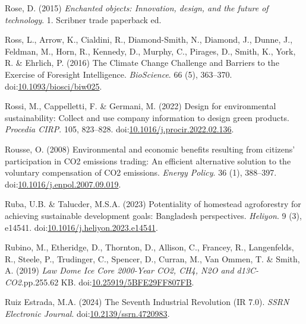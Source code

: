 \documentclass[
  letterpaper,
  DIV=11,
  numbers=noendperiod]{scrartcl}
\newlength{\cslhangindent}
\newenvironment{CSLReferences}[2] %
 {\begin{list}{}{%
  \setlength{\itemindent}{0pt}
  \setlength{\leftmargin}{0pt}
  \setlength{\parsep}{0pt}
  \ifodd #1
   \setlength{\leftmargin}{\cslhangindent}
   \setlength{\itemindent}{-1\cslhangindent}
  \fi
  \setlength{\itemsep}{#2\baselineskip}}}
 {\end{list}}
\begin{document}
\begin{CSLReferences}{0}{1}
Rose, D. (2015) \emph{Enchanted objects: Innovation, design, and the
future of technology}. 1. Scribner trade paperback ed.

Ross, L., Arrow, K., Cialdini, R., Diamond-Smith, N., Diamond, J.,
Dunne, J., Feldman, M., Horn, R., Kennedy, D., Murphy, C., Pirages, D.,
Smith, K., York, R. \& Ehrlich, P. (2016) The {Climate Change Challenge}
and {Barriers} to the {Exercise} of {Foresight Intelligence}.
\emph{BioScience}. 66 (5), 363--370.
doi:\href{https://doi.org/10.1093/biosci/biw025}{10.1093/biosci/biw025}.

Rossi, M., Cappelletti, F. \& Germani, M. (2022) Design for
environmental sustainability: Collect and use company information to
design green products. \emph{Procedia CIRP}. 105, 823--828.
doi:\href{https://doi.org/10.1016/j.procir.2022.02.136}{10.1016/j.procir.2022.02.136}.

Rousse, O. (2008) Environmental and economic benefits resulting from
citizens' participation in {CO2} emissions trading: {An} efficient
alternative solution to the voluntary compensation of {CO2} emissions.
\emph{Energy Policy}. 36 (1), 388--397.
doi:\href{https://doi.org/10.1016/j.enpol.2007.09.019}{10.1016/j.enpol.2007.09.019}.

Ruba, U.B. \& Talucder, M.S.A. (2023) Potentiality of homestead
agroforestry for achieving sustainable development goals: {Bangladesh}
perspectives. \emph{Heliyon}. 9 (3), e14541.
doi:\href{https://doi.org/10.1016/j.heliyon.2023.e14541}{10.1016/j.heliyon.2023.e14541}.

Rubino, M., Etheridge, D., Thornton, D., Allison, C., Francey, R.,
Langenfelds, R., Steele, P., Trudinger, C., Spencer, D., Curran, M., Van
Ommen, T. \& Smith, A. (2019) \emph{Law {Dome Ice Core} 2000-{Year CO2},
{CH4}, {N2O} and {d13C-CO2}}.pp.255.62 KB.
doi:\href{https://doi.org/10.25919/5BFE29FF807FB}{10.25919/5BFE29FF807FB}.

Ruiz Estrada, M.A. (2024) The {Seventh Industrial Revolution} ({IR}
7.0). \emph{SSRN Electronic Journal}.
doi:\href{https://doi.org/10.2139/ssrn.4720983}{10.2139/ssrn.4720983}.


\end{CSLReferences}
\end{document}
